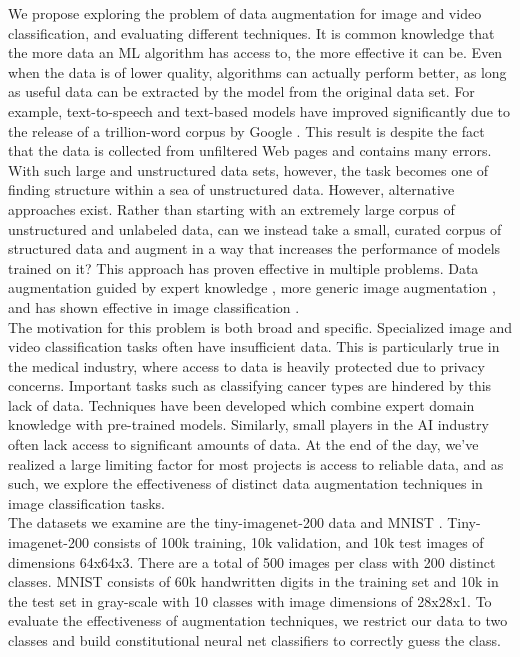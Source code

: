 \documentclass[10pt,twocolumn,letterpaper]{article}
\begin{document}
We propose exploring the problem of data augmentation for image and video classification, and evaluating different techniques. It is common knowledge that the more data an ML algorithm has access to, the more effective it can be. Even when the data is of lower quality, algorithms can actually perform better, as long as useful data can be extracted by the model from the original data set. For example, text-to-speech and text-based models have improved significantly due to the release of a trillion-word corpus by Google \cite{EffectivenessOfData}. This result is despite the fact that the data is collected from unfiltered Web pages and contains many errors. With such large and unstructured data sets, however, the task becomes one of finding structure within a sea of unstructured data. However, alternative approaches exist. Rather than starting with an extremely large corpus of unstructured and unlabeled data, can we instead take a small, curated corpus of structured data and augment in a way that increases the performance of models trained on it? This approach has proven effective in multiple problems. Data augmentation guided by expert knowledge \cite{expert_knowledge_augmentation}, more generic image augmentation \cite{general_data_augmentation}, and has shown effective in image classification \cite{classification_augmentation}.\\

The motivation for this problem is both broad and specific. Specialized image and video classification tasks often have insufficient data. This is particularly true in the medical industry, where access to data is heavily protected due to privacy concerns. Important tasks such as classifying cancer types \cite{expert_knowledge_augmentation} are hindered by this lack of data. Techniques have been developed which combine expert domain knowledge with pre-trained models. Similarly, small players in the AI industry often lack access to significant amounts of data. At the end of the day, we've realized a large limiting factor for most projects is access to reliable data, and as such, we explore the effectiveness of distinct data augmentation techniques in image classification tasks.\\

The datasets we examine are the tiny-imagenet-200 data and MNIST \cite{MNISTExample} \cite{MNISTdata} . Tiny-imagenet-200 consists of 100k training, 10k validation, and 10k test images of dimensions 64x64x3. There are a total of 500 images per class with 200 distinct classes. MNIST consists of 60k handwritten digits in the training set and 10k in the test set in gray-scale with 10 classes with image dimensions of 28x28x1. To evaluate the effectiveness of augmentation techniques, we restrict our data to two classes and build constitutional neural net classifiers to correctly guess the class. \\
\end{document}
